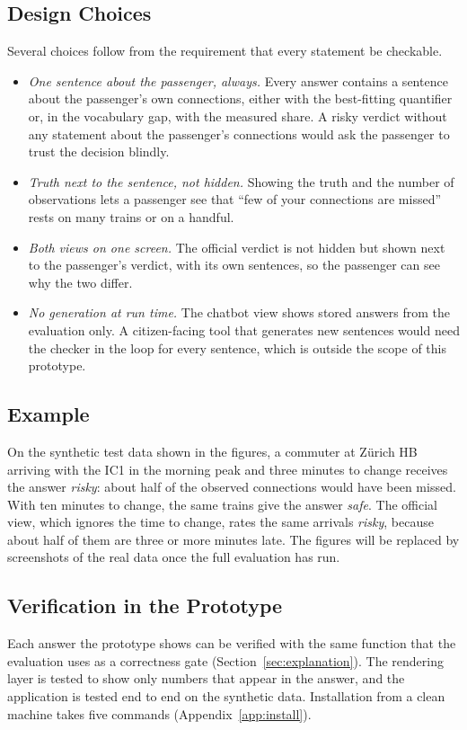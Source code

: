 \subsection{Design Choices}
\label{sec:design}
Several choices follow from the requirement that every statement be checkable.
\begin{itemize}
  \item \emph{One sentence about the passenger, always.} Every answer contains a sentence
  about the passenger's own connections, either with the best-fitting quantifier or, in the
  vocabulary gap, with the measured share. A risky verdict without any statement about the
  passenger's connections would ask the passenger to trust the decision blindly.
  \item \emph{Truth next to the sentence, not hidden.} Showing the truth and the number of
  observations lets a passenger see that ``few of your connections are missed'' rests on many
  trains or on a handful.
  \item \emph{Both views on one screen.} The official verdict is not hidden but shown next to
  the passenger's verdict, with its own sentences, so the passenger can see why the two
  differ.
  \item \emph{No generation at run time.} The chatbot view shows stored answers from the
  evaluation only. A citizen-facing tool that generates new sentences would need the
  checker in the loop for every sentence, which is outside the scope of this prototype.
\end{itemize}

\subsection{Example}
\label{sec:example}
On the synthetic test data shown in the figures, a commuter at Zürich HB arriving with the
IC1 in the morning peak and three minutes to change receives the answer \emph{risky}: about
half of the observed connections would have been missed. With ten minutes to change, the
same trains give the answer \emph{safe}. The official view, which ignores the time to
change, rates the same arrivals \emph{risky}, because about half of them are three or more
minutes late. The figures will be replaced by screenshots of the real data once the full
evaluation has run.

\subsection{Verification in the Prototype}
\label{sec:proto-verification}
Each answer the prototype shows can be verified with the same function that the evaluation
uses as a correctness gate (Section~\ref{sec:explanation}). The rendering layer is tested to
show only numbers that appear in the answer, and the application is tested end to end on the
synthetic data. Installation from a clean machine takes five commands
(Appendix~\ref{app:install}).
